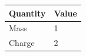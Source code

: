 \documentclass{article}
\begin{document}
\begin{tabular}{>{\raggedleft\arraybackslash}p{}l}
\toprule
Quantity & Value \\
\midrule
Mass & 1 \\
Charge & 2 \\
\bottomrule
\end{tabular}
\end{document}
